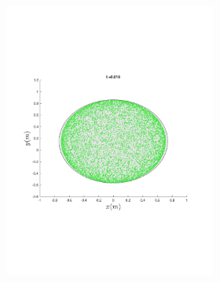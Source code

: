 \begin{figure}
{\begin{subfigure}{0.5\textwidth}
\begin{subfigure}[b]{0.5\textwidth}
        \includegraphics[trim={1cm 7cm 1cm 7cm},
        width=\textwidth]{figures/method/FunnelSimOverlaid3funnel-1}
      \end{subfigure}%
      \\
      \begin{subfigure}[b]{0.5\textwidth}

\end{subfigure}
\end{subfigure}}
\end{figure}

